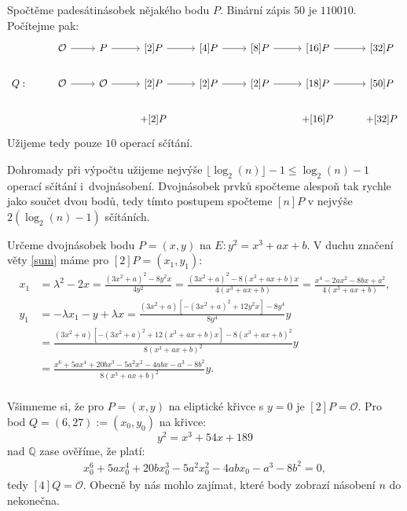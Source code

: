 \documentclass[12pt]{report}
\begin{document}
\begin{priklad}
Spočtěme padesátinásobek nějakého bodu $P$. Binární zápis $50$ je $110010$. Počítejme pak:
\begin{equation*}
\begin{tikzcd}[arrows=to]
& \mathcal{O} \rar & P \rar & {[2]}P \rar & {[4]}P \rar & {[8]}P \rar & {[16]}P \rar & {[32]} P   \\
Q: &   \mathcal{O} \rar & \mathcal{O} \rar & {[2]}P \rar & {[2]}P \rar & {[2]}P \rar & {[18]}P \rar & {[50]} P   \\
 &  &  & + {[2]}P  & & & + {[16]}P  & +{[32]}P 
    \end{tikzcd} 
\end{equation*}
Užijeme tedy pouze $10$ operací sčítání.
\end{priklad}
 

Dohromady při výpočtu užijeme nejvýše $\lfloor \log_2(n) \rfloor -1 \leqslant \log_2(n)-1$ operací sčítání i~dvojnásobení. Dvojnásobek prvků spočteme alespoň tak rychle jako součet dvou bodů, tedy tímto postupem spočteme $[n]P$ v nejvýše $2( \log_2(n)-1)$ sčítáních.

\begin{priklad}\label{priklad2}
Určeme dvojnásobek bodu $P = (x,y)$ na $E : y^2 = x^3 + ax + b$. V duchu značení věty \ref{sum} máme pro $[2] P = (x_1,y_1)$:
\begin{align*}
x_1 &= \lambda^2 - 2x = \frac{(3x ^2 + a)^2 - 8 y^2 x }{4 y ^2} = \frac{(3x ^2 + a)^2 - 8 (x^3+ax+b) x }{4 (x^3+ax+b)} = \frac{x^4-2a x^2 - 8bx + a^2}{4 (x^3+ax+b)},\\
y_1 &=  - \lambda x_1 - y + \lambda x = \frac{(3x^2 + a)[-(3x ^2 + a)^2 + 12 y^2 x] - 8y^4}{8y^4} y \\
&=  \frac{(3x^2 + a)[-(3x ^2 + a)^2 + 12 (x^3 + ax + b) x] - 8 (x^3 + ax + b)^2}{8(x^3 + ax + b)^2} y\\
&= \frac{x^6 + 5 a x^4 + 20 b x^3 - 5 a^2 x^2 - 4ab x - a^3 - 8 b^2}{8(x^3 + ax + b)^2} y.  \\
\end{align*}
\end{priklad}


Všimneme si, že pro $P = (x,y)$ na eliptické křivce s $y=0$ je $[2] P = \mathcal{O}$. Pro bod $Q = (6,27) := (x_0,y_0)$ na křivce:
\begin{equation*}
y^2 = x^3 +54x+189
\end{equation*}
nad $\mathbb{Q}$ zase ověříme, že platí:
\begin{align*}
x_0^6 + 5 a x_0^4 + 20 b x_0^3 - 5 a^2 x_0^2 - 4ab x_0 - a^3 - 8 b^2 = 0,
\end{align*}
tedy $[4]Q = \mathcal{O}$. Obecně by nás mohlo zajímat, které body zobrazí násobení $n$ do nekonečna.
\end{document}
